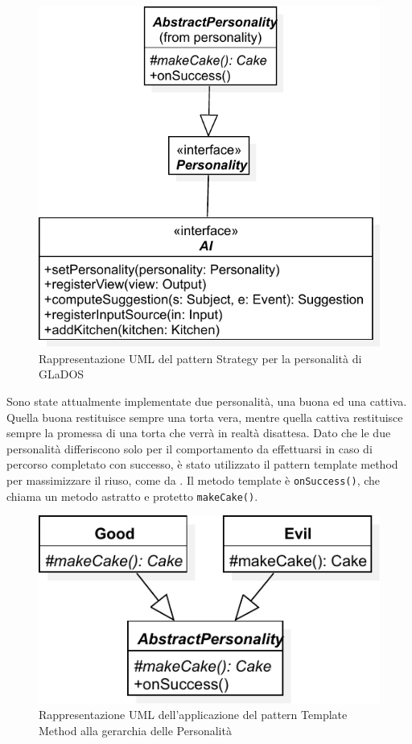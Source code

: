 \documentclass[a4paper,12pt]{report}
\begin{document}
\begin{figure}[H]
\centering{}
\includegraphics[width=\textwidth]{img/strategy}
\caption{Rappresentazione UML del pattern Strategy per la personalità di GLaDOS}
\label{img:strategy}
\end{figure}

Sono state attualmente implementate due personalità, una buona ed una cattiva.
Quella buona restituisce sempre una torta vera, mentre quella cattiva restituisce sempre la 
promessa di una torta che verrà in realtà disattesa.
Dato che le due personalità differiscono solo per il comportamento da effettuarsi in caso di percorso completato con successo, è stato utilizzato il pattern template method per massimizzare il riuso, come da .
Il metodo template è \texttt{onSuccess()}, che chiama un metodo astratto e protetto 
\texttt{makeCake()}.

\begin{figure}[H]
\centering{}
\includegraphics[width=\textwidth]{img/template}
\caption{Rappresentazione UML dell'applicazione del pattern Template Method alla gerarchia delle Personalità}
\label{img:template}
\end{figure}
\end{document}
